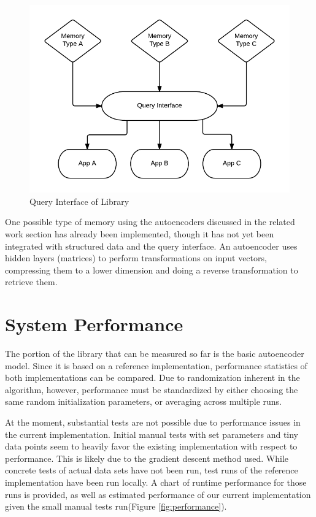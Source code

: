 \documentclass{sig-alternate}
\begin{document}
\begin{figure}[h]
	\begin{center}
		\includegraphics[width=1\linewidth]{queryint}
	\end{center}
	\vspace{-12pt}
	\caption{Query Interface of Library}
	\label{fig:queryint}
\end{figure}

One possible type of memory using the autoencoders discussed in the related work
section has already been implemented, though it has not yet been integrated with
structured data and the query interface. An autoencoder uses hidden layers (matrices) to perform 
transformations on input vectors, compressing them to a lower dimension and doing a reverse 
transformation to retrieve them. 


\section{System Performance}
\label{sec:sysperformance}

The portion of the library that can be measured so far is the basic autoencoder model. 
Since it is based on a reference implementation, performance statistics of both
implementations can be compared. Due to randomization inherent in the algorithm, however, 
performance must be standardized by either choosing the same random initialization parameters, or 
averaging across multiple runs. 

At the moment, substantial tests are not possible due to performance issues in the current 
implementation. Initial manual tests with set parameters and tiny data points seem to heavily favor 
the existing implementation with respect to performance. This is likely due to the gradient descent
method used. While concrete tests of actual data sets have not 
been run, test runs of the reference implementation have been run locally. A chart of runtime
performance for those runs is provided, as well as estimated performance of our current 
implementation given the small manual tests run(Figure \ref{fig:performance}). 
\end{document}
